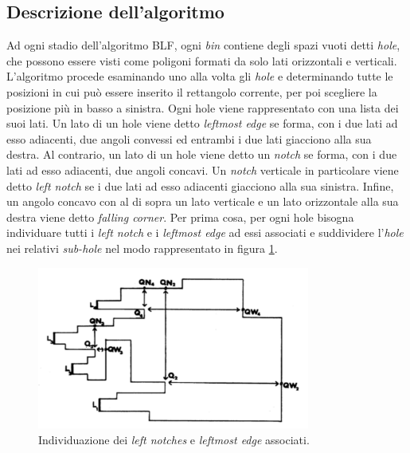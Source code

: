\subsection{Descrizione dell'algoritmo}
Ad ogni stadio dell'algoritmo BLF, ogni \emph{bin} contiene degli spazi vuoti detti \emph{hole}, che possono essere visti come poligoni formati da solo lati orizzontali e verticali. L'algoritmo procede esaminando uno alla volta gli \emph{hole} e determinando tutte le posizioni in cui può essere inserito il rettangolo corrente, per poi scegliere la posizione più in basso a sinistra. Ogni hole viene rappresentato con una lista dei suoi lati. Un lato di un hole viene detto \emph{leftmost edge} se forma, con i due lati ad esso adiacenti, due angoli convessi ed entrambi i due lati giacciono alla sua destra. Al contrario, un lato di un hole viene detto un \emph{notch} se forma, con i due lati ad esso adiacenti, due angoli concavi. Un \emph{notch} verticale in particolare viene detto \emph{left notch} se i due lati ad esso adiacenti giacciono alla sua sinistra. Infine, un angolo concavo con al di sopra un lato verticale e un lato orizzontale alla sua destra viene detto \emph{falling corner}.
Per prima cosa, per ogni hole bisogna individuare tutti i \emph{left notch} e i \emph{leftmost edge} ad essi associati e suddividere l'\emph{hole} nei relativi \emph{sub-hole} nel modo rappresentato in figura \ref{fig:imgBLF1}.

\begin{figure}[h!tp]
 \centering
 \includegraphics[width=0.8\textwidth]{./img/imgBLF1.pdf}
 \caption{Individuazione dei \emph{left notches} e \emph{leftmost edge} associati.}
 \label{fig:imgBLF1}
\end{figure}

